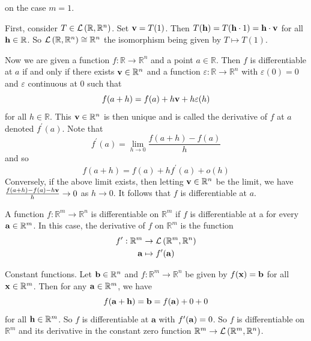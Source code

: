 \documentclass[a4paper]{article}
\begin{document}
\begin{remark}
    on the case $m=1$.

First, consider $T \in {\mathcal{L}}\left(\mathbb{R}, \mathbb{R}^{n}\right)$. Set ${\bf v}=T(1)$. Then $T({\bf h})=T({\bf h} \cdot 1)={\bf h} \cdot {\bf v}$ for all ${\bf h} \in \mathbb{R}$. So ${\mathcal{L}}\left(\mathbb{R}, \mathbb{R}^{n}\right) \cong \mathbb{R}^{n}$ the isomorphism being given by $T \mapsto T(1)$.

Now we are given a function $f: \mathbb{R} \rightarrow \mathbb{R}^{n}$ and a point $a \in \mathbb{R}$. Then $f$ is differentiable at $a$ if and only if there exists ${\bf v} \in \mathbb{R}^{n}$ and a function $\varepsilon: \mathbb{R} \rightarrow \mathbb{R}^{n}$ with $\varepsilon(0)=0$ and $\varepsilon$ continuous at 0 such that
$$
f(a+h)=f(a)+h {\bf v}+h \varepsilon(h)
$$
for all $h \in \mathbb{R}$. This ${\bf v} \in \mathbb{R}^{n}$ is then unique and is called the derivative of $f$ at $a$ denoted $f^{\prime}(a)$. Note that
$$
f^{\prime}(a)=\lim _{h \rightarrow 0} \frac{f(a+h)-f(a)}{h}
$$
and so
$$
f(a+h)=f(a)+h f^{\prime}(a)+o(h)
$$
Conversely, if the above limit exists, then letting ${\bf v} \in \mathbb{R}^{n}$ be the limit, we have $\frac{f(a+h)-f(a)-h {\bf v}}{h} \rightarrow 0$ as $h \rightarrow 0$. It follows that $f$ is differentiable at $a$.
\end{remark}

\begin{definition}
    A function $f: \mathbb{R}^{m} \rightarrow \mathbb{R}^{n}$ is differentiable on $\mathbb{R}^{m}$ if $f$ is differentiable at a for every ${\bf a} \in \mathbb{R}^{m}$. In this case, the derivative of $f$ on $\mathbb{R}^{m}$ is the function
$$
\begin{aligned}
f^{\prime}: \mathbb{R}^{m} & \rightarrow {\mathcal{L}}\left(\mathbb{R}^{m}, \mathbb{R}^{n}\right) \\
{\bf a} & \mapsto f^{\prime}({\bf a})
\end{aligned}
$$
\end{definition}

\begin{example}
    Constant functions. Let ${\bf b} \in \mathbb{R}^{n}$ and $f: \mathbb{R}^{m} \rightarrow \mathbb{R}^{n}$ be given by $f({\bf x})={\bf b}$ for all ${\bf x} \in \mathbb{R}^{m}$. Then for any ${\bf a} \in \mathbb{R}^{m}$, we have
$$
f({\bf a}+{\bf h})={\bf b}=f({\bf a})+0+0
$$
for all ${\bf h} \in \mathbb{R}^{m}$. So $f$ is differentiable at $\mathbf{a}$ with $f^{\prime}({\bf a})=0$. So $f$ is differentiable on $\mathbb{R}^{m}$ and its derivative in the constant zero function $\mathbb{R}^{m} \rightarrow {\mathcal{L}}\left(\mathbb{R}^{m}, \mathbb{R}^{n}\right)$.
\end{example}
\end{document}
